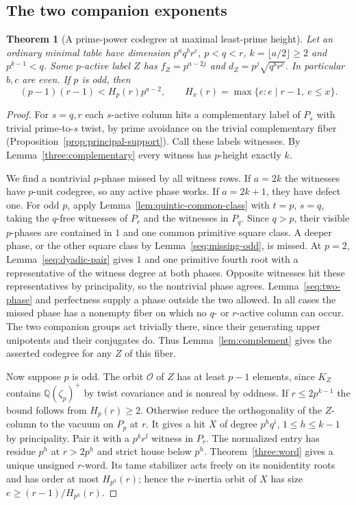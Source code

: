 \documentclass[11pt,a4paper]{article}
\numberwithin{equation}{section}
\newtheorem{theorem}{Theorem}[section]
\theoremstyle{remark}
\begin{document}
\subsection{The two companion exponents}\label{fam:M:sec:7.3}
\begin{theorem}[A prime-power codegree at maximal least-prime height]\label{fam:M:7.9}\label{three:height}\label{seq:odd-five-five}\label{range}\label{seq:ordinary-five}
Let an ordinary minimal table have dimension $p^a q^b r^c$, $p<q<r$, $k=\lfloor a/2\rfloor\ge2$ and $p^{k-1}<q$. Some $p$-active label $Z$ has $f_Z=p^{a-2j}$ and $d_Z=p^j\sqrt{q^b r^c}$. In particular $b,c$ are even. If $p$ is odd, then
\[
 (p-1)(r-1)<H_p(r)p^{a-2},\qquad H_x(r)=\max\{e:e\mid r-1,\ e\le x\}.
\]
\end{theorem}
\begin{proof}
For $s=q,r$ each $s$-active column hits a complementary label of
$P_s$ with trivial prime-to-$s$ twist, by prime avoidance on the
trivial complementary fiber (Proposition~\ref{prop:principal-support}).
Call these labels witnesses. By Lemma~\ref{three:complementary} every witness has $p$-height exactly $k$.

We find a nontrivial $p$-phase missed by all witness rows. If $a=2k$ the witnesses have $p$-unit codegree, so any active phase works. If $a=2k+1$, they have defect one. For odd $p$, apply Lemma~\ref{lem:quintic-common-class} with
$t=p$, $s=q$, taking the $q$-free witnesses of $P_r$ and the witnesses
in $P_q$. Since $q>p$, their visible $p$-phases are contained in $1$
and one common primitive square class. A deeper phase, or the other
square class by Lemma~\ref{seq:missing-odd}, is missed.
At $p=2$, Lemma~\ref{seq:dyadic-pair} gives $1$ and one primitive
fourth root with a representative of the witness degree at both phases.
Opposite witnesses hit these representatives by principality, so the
nontrivial phase agrees. Lemma~\ref{seq:two-phase} and perfectness
supply a phase outside the two allowed. In all cases the missed phase has a nonempty fiber on which no $q$- or $r$-active column can occur. The two companion groups act trivially there, since their generating upper unipotents and their conjugates do. Thus Lemma~\ref{lem:complement} gives the asserted codegree for any $Z$ of this fiber.

Now suppose $p$ is odd. The orbit $\mathcal O$ of $Z$ has at least $p-1$ elements, since $K_Z$ contains $\mathbb Q(\zeta_p)^+$ by twist covariance and is nonreal by oddness. If $r\le2p^{k-1}$ the bound follows from $H_p(r)\ge2$. Otherwise reduce the orthogonality of the $Z$-column to the vacuum on $P_p$ at $r$. It gives a hit $X$ of degree $p^h q^i$, $1\le h\le k-1$ by principality. Pair it with a $p^kr^l$ witness in $P_r$. The normalized entry has residue $p^h$ at $r>2p^h$ and strict house below $p^h$. Theorem~\ref{three:word} gives a unique unsigned $r$-word. Its tame stabilizer acts freely on its nonidentity roots and has order at most $H_{p^h}(r)$; hence the $r$-inertia orbit of $X$ has size $e\ge(r-1)/H_{p^h}(r)$.


\end{proof}
\end{document}
